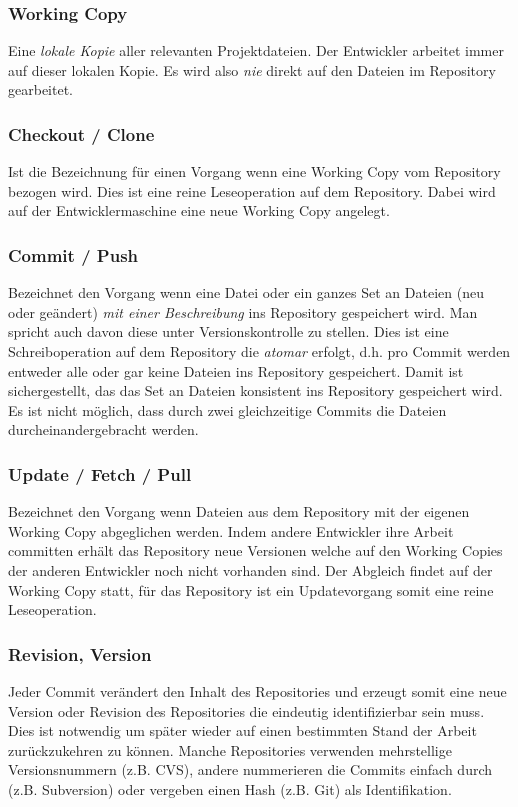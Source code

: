 \documentclass[10pt]{article}
\begin{document}
\subsubsection{Working Copy}
Eine \textit{lokale Kopie} aller relevanten Projektdateien. Der Entwickler arbeitet immer auf dieser lokalen Kopie. Es wird also \textit{nie} direkt auf den Dateien im Repository gearbeitet.
\subsubsection{Checkout / Clone}
Ist die Bezeichnung für einen Vorgang wenn eine Working Copy vom Repository bezogen wird. Dies ist eine reine Leseoperation auf dem Repository. Dabei wird auf der Entwicklermaschine eine neue Working Copy angelegt.
\subsubsection{Commit / Push}
Bezeichnet den Vorgang wenn eine Datei oder ein ganzes Set an Dateien (neu oder geändert) \textit{mit einer Beschreibung} ins Repository gespeichert wird. Man spricht auch davon diese unter Versionskontrolle zu stellen. Dies ist eine Schreiboperation auf dem Repository die \textit{atomar} erfolgt, d.h. pro Commit werden entweder alle oder gar keine Dateien ins Repository gespeichert. Damit ist sichergestellt, das das Set an Dateien konsistent ins Repository gespeichert wird. Es ist nicht möglich, dass durch zwei gleichzeitige Commits die Dateien durcheinandergebracht werden.
\subsubsection{Update / Fetch / Pull}
Bezeichnet den Vorgang wenn Dateien aus dem Repository mit der eigenen Working Copy abgeglichen werden. Indem andere Entwickler ihre Arbeit committen erhält das Repository neue Versionen welche auf den Working Copies der anderen Entwickler noch nicht vorhanden sind. Der Abgleich findet auf der Working Copy statt, für das Repository ist ein Updatevorgang somit eine reine Leseoperation.
\subsubsection{Revision, Version}
Jeder Commit verändert den Inhalt des Repositories und erzeugt somit eine neue Version oder Revision des Repositories die eindeutig identifizierbar sein muss. Dies ist notwendig um später wieder auf einen bestimmten Stand der Arbeit zurückzukehren zu können. Manche Repositories verwenden mehrstellige Versionsnummern (z.B. CVS), andere nummerieren die Commits einfach durch (z.B. Subversion) oder vergeben einen Hash (z.B. Git) als Identifikation.
\end{document}
